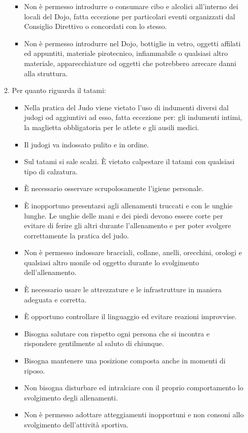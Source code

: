 \documentclass{djtsdoc}
\begin{document}
\begin{enumerate}
\begin{enumerate}
\begin{itemize}
				\item Non è permesso introdurre o consumare cibo e alcolici all'interno dei locali del Dojo, fatta eccezione per particolari eventi organizzati dal Consiglio Direttivo o concordati con lo stesso. 
				\item Non è permesso introdurre nel Dojo, bottiglie in vetro, oggetti affilati ed appuntiti, materiale pirotecnico, infiammabile o qualsiasi altro materiale, apparecchiature od oggetti che potrebbero arrecare danni alla struttura.
			\end{itemize}
			\item Per quanto riguarda il tatami:
			\begin{itemize}
				\item Nella pratica del Judo viene vietato l'uso di indumenti diversi dal judogi od aggiuntivi ad esso, fatta eccezione per: gli indumenti intimi,  la maglietta obbligatoria per le atlete e  gli ausili medici. 
				\item Il judogi va indossato pulito e in ordine.
				\item Sul tatami si sale scalzi. È vietato calpestare il tatami con qualsiasi tipo di calzatura.
				\item È necessario osservare scrupolosamente l'igiene personale. 
				\item È inopportuno presentarsi agli allenamenti truccati e con le unghie lunghe. Le unghie delle mani e dei piedi devono essere corte per evitare di ferire gli altri durante l'allenamento e per poter svolgere correttamente la pratica del judo. 
				\item Non è permesso indossare bracciali, collane, anelli, orecchini, orologi e qualsiasi altro 	monile od oggetto durante lo svolgimento dell'allenamento. 
				\item È necessario usare le attrezzature e le infrastrutture in maniera adeguata e corretta. 
				\item È opportuno controllare il linguaggio ed evitare reazioni improvvise.
				\item Bisogna salutare con rispetto ogni persona che si incontra e rispondere gentilmente al saluto di chiunque.
				\item Bisogna mantenere una posizione composta  anche in momenti di riposo.
				\item Non bisogna disturbare ed intralciare con il proprio comportamento lo svolgimento degli allenamenti.
				\item Non è permesso adottare atteggiamenti inopportuni e non consoni allo svolgimento 	dell'attività sportiva.

\end{itemize}
\end{enumerate}
\end{enumerate}
\end{document}
